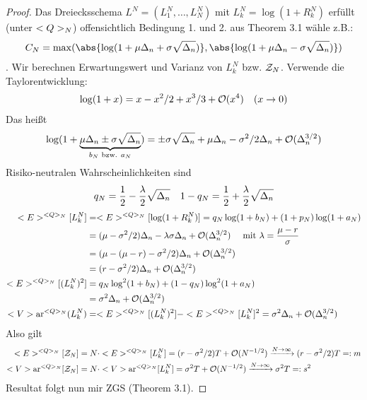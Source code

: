 \begin{proof}
	Das Dreiecksschema $L^N = (L^N_1, \dots, L_N^N)$ mit $L^N_k = \log(1+R^N_k)$ erfüllt (unter $<Q>_N$) offensichtlich Bedingung 1. und 2. aus Theorem 3.1 %
	wähle z.B.: 
	\begin{align*}
		C_N = \max(\abs{\log(1+\mu\Delta_n + \sigma\sqrt{\Delta_n})}, \abs{\log(1+\mu \Delta_n - \sigma\sqrt{\Delta_n})})
	\end{align*}
	. Wir berechnen Erwartungswert und Varianz von $L^N_k$ bzw. $\mathcal{Z}_N$. Verwende die Taylorentwicklung:
	\begin{align*}
		\log(1+x) = x - x^2/2 + x^3/3 + \mathcal{O}(x^4) \quad (x \to 0)
	\end{align*}
	Das heißt
	\begin{align*}
		\log(1+ \underbrace{\mu \Delta_n \pm \sigma\sqrt{\Delta_n}}_{b_N \text{ bzw. }a_N}) = \pm \sigma \sqrt{\Delta_n} + \mu \Delta_n - \sigma^2/2 \Delta_n + \mathcal{O}(\Delta_n^{3/2})
	\end{align*}
	Risiko-neutralen Wahrscheinlichkeiten sind
	\begin{align*}
		q_N = \frac{1}{2} - \frac{\lambda}{2}\sqrt{\Delta_n}\quad 1-q_N = \frac{1}{2} + \frac{\lambda}{2}\sqrt{\Delta_n}
	\end{align*}
	\begin{align*}
		<E>^{<Q>_N}[L^N_k] &= <E>^{<Q>_N}[\log(1+R^N_k)] = q_N\log(1+b_N) + (1+p_N)\log(1+a_N)\\
		&= (\mu - \sigma^2/2)\Delta_n - \lambda\sigma\Delta_n + \mathcal{O}(\Delta_n^{3/2}) \quad \text{ mit } \lambda = \frac{\mu -r}{\sigma}\\
		&= (\mu - (\mu - r) - \sigma^2/2) \Delta_n + \mathcal{O}(\Delta_n^{3/2})\\
		&= (r-\sigma^2/2)\Delta_n + \mathcal{O}(\Delta_n^{3/2})\\
		<E>^{<Q>_N}[(L^N_k)^2] &= q_N\log^2(1+b_N) + (1-q_N)\log^2(1+a_N)\\
		&= \sigma^2\Delta_n + \mathcal{O}(\Delta_n^{3/2})\\
		<V>\text{ar}^{<Q>_N}(L^N_k) &= <E>^{<Q>_N}[(L^N_k)^2]-<E>^{<Q>_N}[L^N_k]^2 = \sigma^2\Delta_n + \mathcal{O}(\Delta_n^{3/2})
	\end{align*}
	Also gilt
	\begin{align*}
		<E>^{<Q>_N}[\mathcal{Z}_N] &= N \cdot <E>^{<Q>_N}[L_k^N] = (r-\sigma^2/2)T + \mathcal{O}(N^{-1/2}) \xrightarrow{N \to \infty} (r-\sigma^2/2)T =: m\\
		<V>\text{ar}^{<Q>_N}[\mathcal{Z}_N] &= N \cdot <V>\text{ar}^{<Q>_N}[L^N_k] = \sigma^2 T + \mathcal{O}(N^{-1/2}) \xrightarrow{N \to \infty} \sigma^2T =:s^2
	\end{align*}
	Resultat folgt nun mir ZGS (Theorem 3.1).
\end{proof}
